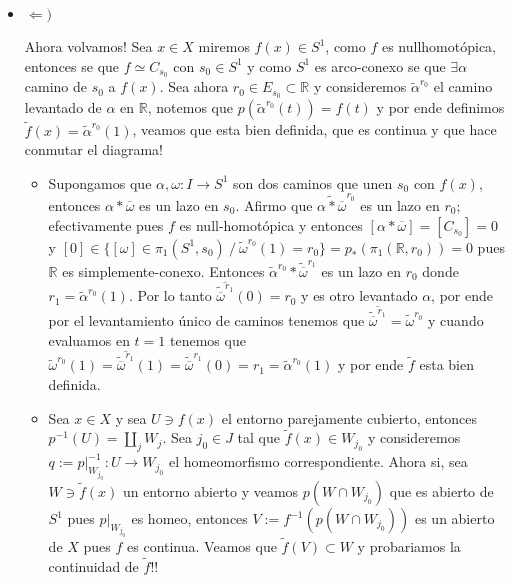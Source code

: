 \documentclass[11pt]{article}
\newcommand{\R}{{\mathbb{R}}}
\newenvironment{proof}[1][Demostraci\'on]{\begin{trivlist}
\item[\hskip \labelsep {\bfseries #1}]}{\end{trivlist}}
\begin{document}
\begin{enumerate}
\begin{proof}
\begin{itemize}
\item {$\Longleftarrow)$}

Ahora volvamos! Sea $x \in X$ miremos $f(x) \in S^1$, como $f$ es nullhomot\'opica, entonces se que $f \simeq C_{s_0}$ con $s_0 \in S^1$ y como $S^1$ es arco-conexo se que $\exists \alpha$ camino de $s_0$ a $f(x)$. Sea ahora $r_0 \in E_{s_0} \subset \R$ y consideremos $\widetilde{\alpha}^{r_0}$ el camino levantado de $\alpha$ en $\R$, notemos que $p(\widetilde{\alpha}^{r_0}(t))=f(t)$ y por ende definimos $\widetilde{f}(x) = \widetilde{\alpha}^{r_0}(1)$, veamos que esta bien definida, que es continua y que hace conmutar el diagrama!

\begin{itemize}

\item Supongamos que $\alpha,\omega:I \rightarrow S^1$ son dos caminos que unen $s_0$ con $f(x)$, entonces $\alpha*\overline{\omega}$ es un lazo en $s_0$. Afirmo que $\widetilde{\alpha*\overline{\omega}}^{r_0}$ es un lazo en $r_0$; efectivamente pues $f$ es null-homot\'opica y entonces $[\alpha*\overline{\omega}] = [C_{s_0}] = 0$ y $[0] \in \{[\omega] \in \pi_1(S^1,s_0) \ / \ \widetilde{\omega}^{r_0}(1)=r_0 \} = p_*(\pi_1(\R,r_0))=0$ pues $\R$ es simplemente-conexo. Entonces $\widetilde{\alpha}^{r_0}*\widetilde{\overline{\omega}}^{r_1}$ es un lazo en $r_0$ donde $r_1 = \widetilde{\alpha}^{r_0}(1)$. Por lo tanto $\overline{\widetilde{\overline{\omega}}^{r_1}}(0)=r_0$ y es otro levantado $\alpha$, por ende por el levantamiento \'unico de caminos tenemos que $\overline{\widetilde{\overline{\omega}}^{r_1}} = \widetilde{\omega}^{r_0}$ y cuando evaluamos en $t=1$ tenemos que $\widetilde{\omega}^{r_0}(1)=\overline{\widetilde{\overline{\omega}}^{r_1}}(1)=\widetilde{\overline{\omega}}^{r_1}(0)=r_1=\widetilde{\alpha}^{r_0}(1)$ y por ende $\widetilde{f}$ esta bien definida.

\item Sea $x \in X$ y sea $U \ni f(x)$ el entorno parejamente cubierto, entonces $p^{-1}(U) = \coprod_{j}{W_j}$. Sea $j_0 \in J$ tal que $\widetilde{f}(x) \in W_{j_0}$ y consideremos $q:=p|^{-1}_{W_{j_0}} : U \rightarrow W_{j_0}$ el homeomorfismo correspondiente. Ahora si, sea $W \ni \widetilde{f}(x)$ un entorno abierto y veamos $p(W \cap W_{j_0})$ que es abierto de $S^1$ pues $p|_{W_{j_0}}$ es homeo, entonces $V := f^{-1}(p(W \cap W_{j_0}))$ es un abierto de $X$ pues $f$ es continua. Veamos que $\widetilde{f}(V) \subset W$ y probariamos la continuidad de $\widetilde{f}$!!


\end{itemize}
\end{itemize}
\end{proof}
\end{enumerate}
\end{document}
